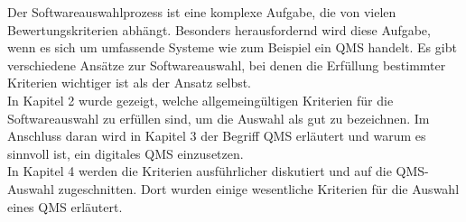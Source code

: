 \documentclass[11pt]{scrartcl}       %
\begin{document}
Der Softwareauswahlprozess ist eine komplexe Aufgabe, die von vielen Bewertungskriterien abhängt. Besonders herausfordernd wird diese Aufgabe, wenn es sich um umfassende Systeme wie zum Beispiel ein QMS handelt. Es gibt verschiedene Ansätze zur Softwareauswahl, bei denen die Erfüllung bestimmter Kriterien wichtiger ist als der Ansatz selbst.\\

In Kapitel 2 wurde gezeigt, welche allgemeingültigen Kriterien für die Softwareauswahl zu erfüllen sind, um die Auswahl als gut zu bezeichnen. Im Anschluss daran wird in Kapitel 3 der Begriff QMS erläutert und warum es sinnvoll ist, ein digitales QMS einzusetzen.\\

In Kapitel 4 werden die Kriterien ausführlicher diskutiert und auf die QMS-Auswahl zugeschnitten. Dort wurden einige wesentliche Kriterien für die Auswahl eines QMS erläutert.\\



\newpage
{}
{}
\printbibliography
\end{document}
